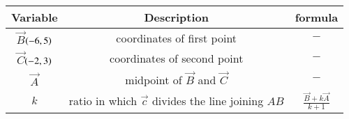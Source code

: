 \begin{tabular}[12pt]{ |c| c|c|}
    \hline
        \textbf{Variable}  & \textbf{Description} & \textbf{formula}\\
    \hline
        $\vec{B}$$\left(-6,5\right)$ &  coordinates of first point & $-$ \\
    \hline 
        $\vec{C}$$\left(-2,3\right)$ & coordinates of second point & $-$\\
    \hline
        $\vec{A}$& midpoint of $\vec{B}$ and $\vec{C}$ & $-$\\ 
    \hline
        $k$ & ratio in which $\vec{c}$ divides the line joining $AB$ & $\frac{\vec{B}+k\vec{A}}{k+1}$\\
    \hline       
\end{tabular}

